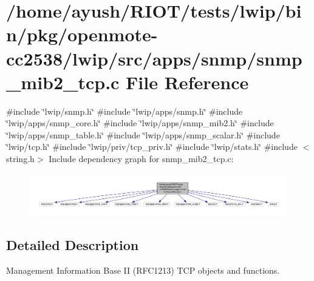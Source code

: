 \hypertarget{openmote-cc2538_2lwip_2src_2apps_2snmp_2snmp__mib2__tcp_8c}{}\section{/home/ayush/\+R\+I\+O\+T/tests/lwip/bin/pkg/openmote-\/cc2538/lwip/src/apps/snmp/snmp\+\_\+mib2\+\_\+tcp.c File Reference}
\label{openmote-cc2538_2lwip_2src_2apps_2snmp_2snmp__mib2__tcp_8c}
{\ttfamily \#include \char`\"{}lwip/snmp.\+h\char`\"{}}\newline
{\ttfamily \#include \char`\"{}lwip/apps/snmp.\+h\char`\"{}}\newline
{\ttfamily \#include \char`\"{}lwip/apps/snmp\+\_\+core.\+h\char`\"{}}\newline
{\ttfamily \#include \char`\"{}lwip/apps/snmp\+\_\+mib2.\+h\char`\"{}}\newline
{\ttfamily \#include \char`\"{}lwip/apps/snmp\+\_\+table.\+h\char`\"{}}\newline
{\ttfamily \#include \char`\"{}lwip/apps/snmp\+\_\+scalar.\+h\char`\"{}}\newline
{\ttfamily \#include \char`\"{}lwip/tcp.\+h\char`\"{}}\newline
{\ttfamily \#include \char`\"{}lwip/priv/tcp\+\_\+priv.\+h\char`\"{}}\newline
{\ttfamily \#include \char`\"{}lwip/stats.\+h\char`\"{}}\newline
{\ttfamily \#include $<$string.\+h$>$}\newline
Include dependency graph for snmp\+\_\+mib2\+\_\+tcp.\+c\+:
\nopagebreak
\begin{figure}[H]
\begin{center}
\leavevmode
\includegraphics[width=350pt]{openmote-cc2538_2lwip_2src_2apps_2snmp_2snmp__mib2__tcp_8c__incl}
\end{center}
\end{figure}


\subsection{Detailed Description}
Management Information Base II (R\+F\+C1213) T\+CP objects and functions. 